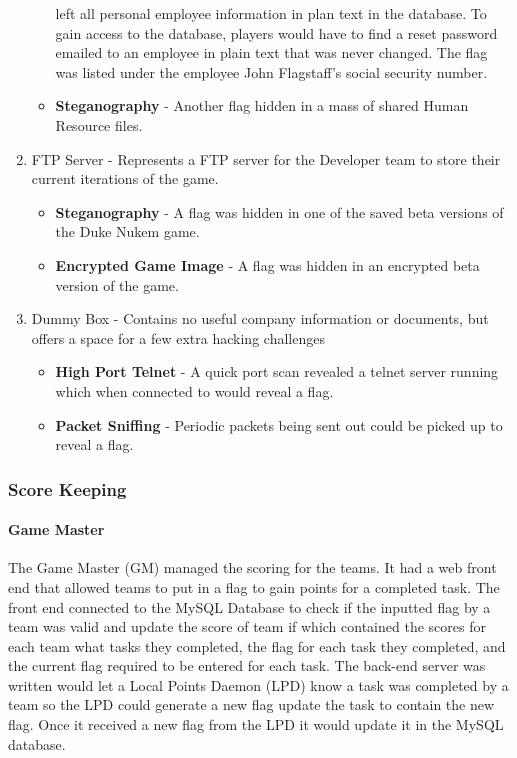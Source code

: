 \documentclass[10pt]{article}
\begin{document}
\begin{enumerate}
\begin{itemize}
        left all personal employee information in plan text in the database. To
        gain access to the database, players would have to find a reset password
        emailed to an employee in plain text that was never changed. The flag
        was listed under the employee John Flagstaff's social security number.
        \item \textbf{Steganography} - Another flag hidden in a mass of shared
        Human Resource files.        
      \end{itemize}
  \item FTP Server - Represents a FTP server for the Developer team to store
  their current iterations of the game.
      \begin{itemize}
        \item \textbf{Steganography} - A flag was hidden in one of the saved
        beta versions of the Duke Nukem game.
        \item \textbf{Encrypted Game Image} - A flag was hidden in an encrypted
        beta version of the game.
      \end{itemize}
   \item Dummy Box - Contains no useful company information or documents, but
   offers a space for a few extra hacking challenges
      \begin{itemize}
        \item \textbf{High Port Telnet} - A quick port scan revealed a telnet
        server running which when connected to would reveal a flag.
        \item \textbf{Packet Sniffing} - Periodic packets being sent out
        could be picked up to reveal a flag.
      \end{itemize}
\end{enumerate}

\subsubsection{Score Keeping}

\paragraph*{Game Master}
The Game Master (GM) managed the scoring for the teams. It had a web front end that
allowed teams to put in a flag to gain points for a completed task. The 
front end connected to the MySQL Database to check if the inputted flag by a team was valid
and update the score of team if which contained the scores for each team
what tasks they completed, the flag for each task they completed, and the 
current flag required to be entered for each task. The back-end server was written
would let a Local Points Daemon (LPD) know a task was completed by a team
so the LPD could generate a new flag update the task to contain the new flag. Once
it received a new flag from the LPD it would update it in the MySQL database.
\end{document}
